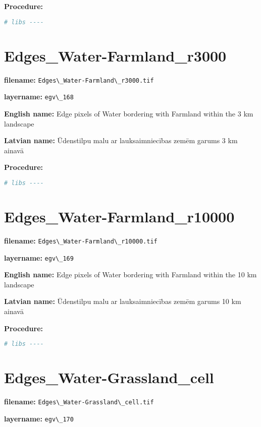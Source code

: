 \documentclass[
]{book}
\newcommand{\passthrough}[1]{#1}
\begin{document}
\textbf{Procedure:}

\begin{lstlisting}[language=R]
# libs ----
\end{lstlisting}

\section{Edges\_Water-Farmland\_r3000}\label{ch06.168}

\textbf{filename:} \passthrough{\lstinline!Edges\_Water-Farmland\_r3000.tif!}

\textbf{layername:} \passthrough{\lstinline!egv\_168!}

\textbf{English name:} Edge pixels of Water bordering with Farmland within the 3 km landscape

\textbf{Latvian name:} Ūdenstilpu malu ar lauksaimniecības zemēm garums 3 km ainavā

\textbf{Procedure:}

\begin{lstlisting}[language=R]
# libs ----
\end{lstlisting}

\section{Edges\_Water-Farmland\_r10000}\label{ch06.169}

\textbf{filename:} \passthrough{\lstinline!Edges\_Water-Farmland\_r10000.tif!}

\textbf{layername:} \passthrough{\lstinline!egv\_169!}

\textbf{English name:} Edge pixels of Water bordering with Farmland within the 10 km landscape

\textbf{Latvian name:} Ūdenstilpu malu ar lauksaimniecības zemēm garums 10 km ainavā

\textbf{Procedure:}

\begin{lstlisting}[language=R]
# libs ----
\end{lstlisting}

\section{Edges\_Water-Grassland\_cell}\label{ch06.170}

\textbf{filename:} \passthrough{\lstinline!Edges\_Water-Grassland\_cell.tif!}

\textbf{layername:} \passthrough{\lstinline!egv\_170!}
\end{document}

